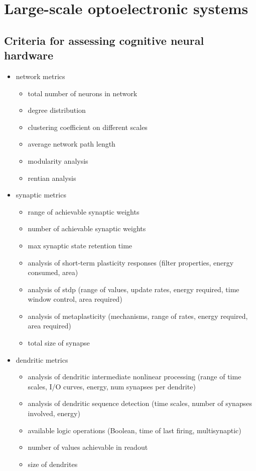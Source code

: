 \documentclass[twocolumn]{article}
\begin{document}
\section{\label{sec:scaling}Large-scale optoelectronic systems}

\subsection{Criteria for assessing cognitive neural hardware}


\begin{itemize}

\item network metrics
\begin{itemize}
\item total number of neurons in network
\item degree distribution
\item clustering coefficient on different scales
\item average network path length
\item modularity analysis
\item rentian analysis
\end{itemize}

\item synaptic metrics
\begin{itemize}
\item range of achievable synaptic weights
\item number of achievable synaptic weights
\item max synaptic state retention time
\item analysis of short-term plasticity responses (filter properties, energy consumed, area)
\item analysis of stdp (range of values, update rates, energy required, time window control, area required)
\item analysis of metaplasticity (mechanisms, range of rates, energy required, area required)
\item total size of synapse
\end{itemize}

\item dendritic metrics
\begin{itemize}
\item analysis of dendritic intermediate nonlinear processing (range of time scales, I/O curves, energy, num synapses per dendrite)
\item analysis of dendritic sequence detection (time scales, number of synapses involved, energy)
\item available logic operations (Boolean, time of last firing, multisynaptic)
\item number of values achievable in readout
\item size of dendrites
\end{itemize}


\end{itemize}
\end{document}
